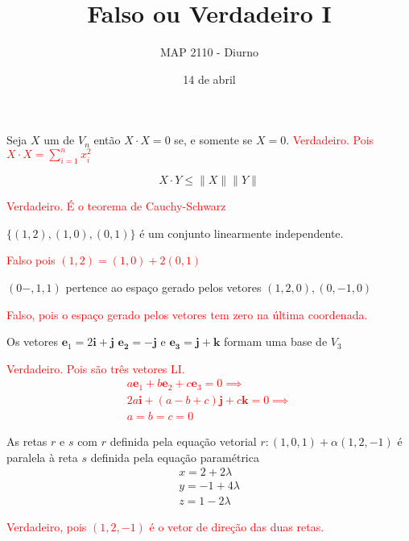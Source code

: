 \documentclass{beamer}
\title[]{Falso ou Verdadeiro I}
\author{MAP 2110 - Diurno}
\institute{IME USP}
\date{14 de abril}
\begin{document}
\begin{frame}
  \titlepage
\end{frame}


\begin{frame}{}
 Seja $X$ um  de $V_n$ então $X\cdot X =0$ se, e somente se $X=0$.
 \textcolor{red}{ Verdadeiro. Pois $X\cdot X= \sum_{i=1}^n x_i^2$ }
\end{frame}

\begin{frame}{}
$$X\cdot Y \leq \|X\|\|Y\|$$

\textcolor{red}{Verdadeiro. É o teorema de Cauchy-Schwarz}
\end{frame}

\begin{frame}
  $\{ (1,2), (1,0), (0,1)\}$ é um conjunto linearmente independente.

  \textcolor{red}{
    Falso pois $(1,2) = (1,0) + 2(0,1)$
  }
\end{frame}

\begin{frame}{}

  $(0-,1, 1)$ pertence ao espaço gerado pelos vetores ${(1,2,0), (0,-1, 0)}$

  \textcolor{red}{
    Falso, pois o espaço gerado pelos vetores tem zero na última coordenada.
  }
\end{frame}

\begin{frame}
  Os vetores $\mathbf{e}_1 = 2\mathbf{i}+\mathbf{j}$ $\mathbf{e_2}= -\mathbf{j}$ e
  $\mathbf{e_3}=\mathbf{j}+\mathbf{k}$ formam uma base de $V_3$

  \textcolor{red}{
    Verdadeiro. Pois são três vetores LI.
    \begin{gather*}
      a\mathbf{e}_1  + b\mathbf{e}_2 +c\mathbf{e}_3 = 0 \implies \\
      2a\mathbf{i} + (a-b+c)\mathbf{j} + c \mathbf{k} = 0 \implies \\
      a=b=c=0
    \end{gather*}
  }
\end{frame}

\begin{frame}
  As retas $r$ e $s$
  com $r$ definida pela equação vetorial  $r: (1,0,1) + \alpha (1,2,-1)$ é paralela 
  à reta $s$ definida pela equação paramétrica
  \begin{gather*}
    x= 2 + 2\lambda \\
    y= -1 + 4\lambda \\
    z= 1  - 2\lambda
  \end{gather*}

  \textcolor{red}{Verdadeiro, pois $(1,2,-1)$ é o vetor de direção das duas retas.}
\end{frame}
\end{document}
